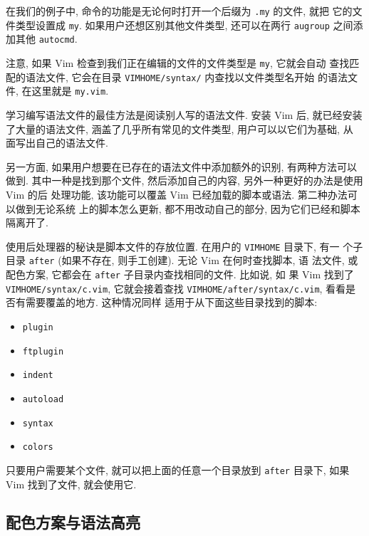 在我们的例子中, 命令的功能是无论何时打开一个后缀为 \texttt{.my} 的文件, 就把
它的文件类型设置成 \texttt{my}. 如果用户还想区别其他文件类型, 还可以在两行
\texttt{augroup} 之间添加其他 \texttt{autocmd}.

注意, 如果 Vim 检查到我们正在编辑的文件的文件类型是 \texttt{my}, 它就会自动
查找匹配的语法文件, 它会在目录 \texttt{VIMHOME/syntax/} 内查找以文件类型名开始
的语法文件, 在这里就是 \texttt{my.vim}.


\begin{warning}
    学习编写语法文件的最佳方法是阅读别人写的语法文件. 安装 Vim 后, 就已经安装
    了大量的语法文件, 涵盖了几乎所有常见的文件类型, 用户可以以它们为基础, 从
    面写出自己的语法文件.
\end{warning}

另一方面, 如果用户想要在已存在的语法文件中添加额外的识别, 有两种方法可以做到.
其中一种是找到那个文件, 然后添加自己的内容, 另外一种更好的办法是使用 Vim 的后
处理功能, 该功能可以覆盖 Vim 已经加载的脚本或语法. 第二种办法可以做到无论系统
上的脚本怎么更新, 都不用改动自己的部分, 因为它们已经和脚本隔离开了.

使用后处理器的秘诀是脚本文件的存放位置. 在用户的 \texttt{VIMHOME} 目录下, 有一
个子目录 \texttt{after} (如果不存在, 则手工创建). 无论 Vim 在何时查找脚本, 语
法文件, 或配色方案, 它都会在 \texttt{after} 子目录内查找相同的文件. 比如说, 如
果 Vim 找到了 \texttt{VIMHOME/syntax/c.vim}, 它就会接着查找
\texttt{VIMHOME/after/syntax/c.vim}, 看看是否有需要覆盖的地方. 这种情况同样
适用于从下面这些目录找到的脚本:
\begin{itemize}
    \item \texttt{plugin}
    \item \texttt{ftplugin}
    \item \texttt{indent}
    \item \texttt{autoload}
    \item \texttt{syntax}
    \item \texttt{colors}
\end{itemize}
只要用户需要某个文件, 就可以把上面的任意一个目录放到 \texttt{after} 目录下,
如果 Vim 找到了文件, 就会使用它.

\subsection{配色方案与语法高亮}
\label{subsec:color_scheme_and_syntax_coloring}

